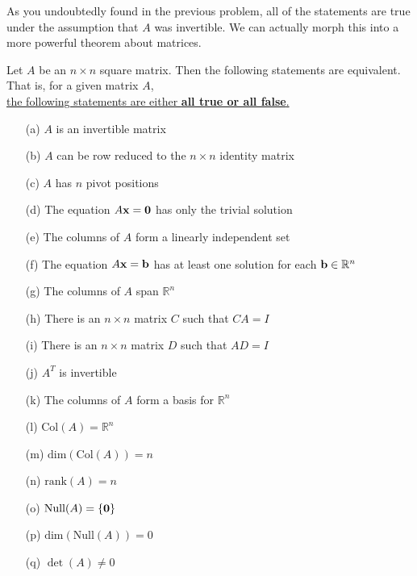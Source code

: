 \newpage


As you undoubtedly found in the previous problem, all of the statements are true under the
assumption that $A$ was invertible.  We can
actually morph this into a more powerful theorem about matrices.  
\begin{thm}
    Let $A$ be an $n \times n$ square matrix.  Then the following statements are
    equivalent.  That is, for a given matrix $A$, \\
    \underline{the following statements are either {\bf all true or
    all false}.}
    \begin{enumerate}
        \item[(a)] $A$ is an invertible matrix
        \item[(b)] $A$ can be row reduced to the $n \times n$ identity matrix
        \item[(c)] $A$ has $n$ pivot positions
        \item[(d)] The equation $A {\bf x} = {\bf 0}$ has only the trivial solution
        \item[(e)] The columns of $A$ form a linearly independent set
        \item[(f)] The equation $A {\bf x} = {\bf b}$ has at least one solution for each ${\bf b} \in
            \mathbb{R}^n$
        \item[(g)] The columns of $A$ span $\mathbb{R}^n$
        \item[(h)] There is an $n \times n$ matrix $C$ such that $CA = I$
        \item[(i)] There is an $n \times n$ matrix $D$ such that $AD = I$
        \item[(j)] $A^T$ is invertible
        \item[(k)] The columns of $A$ form a basis for $\mathbb{R}^n$
        \item[(l)] $\text{Col}(A) = \mathbb{R}^n$
        \item[(m)] $\text{dim}(\text{Col}(A)) = n$
        \item[(n)] $\text{rank}(A) = n$
        \item[(o)] $\text{Null}(A) = \{ {\bf 0} \}$
        \item[(p)] $\text{dim}(\text{Null}(A)) = 0$
        \item[(q)] $\det(A) \ne 0$
    \end{enumerate}
\end{thm}

